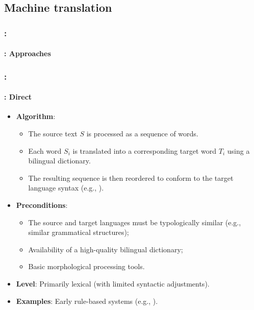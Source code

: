 \documentclass[xcolor=table]{beamer}
\begin{document}
\subsection{Machine translation}

\begin{frame}
	\frametitle{\insertshortsubtitle: \insertsection}
	\framesubtitle{\insertsubsection: Approaches}
	
	
\end{frame}

\begin{frame}
	\frametitle{\insertshortsubtitle: \insertsection}
	\framesubtitle{\insertsubsection: Direct}
	
	\begin{itemize}
		\item \textbf{Algorithm}:
		\begin{itemize}
			\item The source text $S$ is processed as a sequence of words.
			\item Each word $S_i$ is translated into a corresponding target word $T_i$ using a bilingual dictionary.
			\item The resulting sequence is then reordered to conform to the target language syntax (e.g., ).
		\end{itemize}
		\item \textbf{Preconditions}:
		\begin{itemize}
			\item The source and target languages must be typologically similar (e.g., similar grammatical structures);
			\item Availability of a high-quality bilingual dictionary;
			\item Basic morphological processing tools.
		\end{itemize}
		\item \textbf{Level}: Primarily lexical (with limited syntactic adjustments).
		\item \textbf{Examples}: Early rule-based systems (e.g., ).
	\end{itemize}
	
\end{frame}
\end{document}
